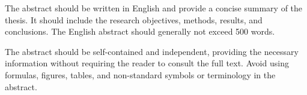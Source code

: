 
\begin{enabstract}

The abstract should be written in English and provide a concise summary of the thesis. It should include the research objectives, methods, results, and conclusions. The English abstract should generally not exceed 500 words.

The abstract should be self-contained and independent, providing the necessary information without requiring the reader to consult the full text. Avoid using formulas, figures, tables, and non-standard symbols or terminology in the abstract.


\end{enabstract}
